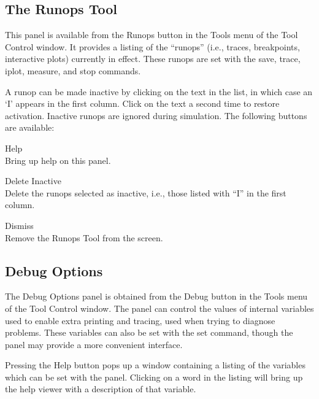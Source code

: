 \subsection{The Runops Tool}
\label{runoppanel}

This panel is available from the {\cb Runops} button in the {\cb Tools}
menu of the {\cb Tool Control} window.  It provides a listing of the
``runops'' (i.e., traces, breakpoints, interactive plots) currently in
effect.  These runops are set with the {\cb save}, {\cb trace}, {\cb
iplot}, {\cb measure}, and {\cb stop} commands.

A runop can be made inactive by clicking on the text in the list, in
which case an `I' appears in the first column.  Click on the text a
second time to restore activation.  Inactive runops are ignored during
simulation.  The following buttons are available:

\begin{description}
\item{\cb Help}\\
    Bring up help on this panel.
\item{\cb Delete Inactive}\\
    Delete the runops selected as inactive, i.e., those listed with
    ``I'' in the first column.
\item{\cb Dismiss}\\
    Remove the {\cb Runops Tool} from the screen.
\end{description}

\subsection{Debug Options}
\label{dbgopts}

The {\cb Debug Options} panel is obtained from the {\cb Debug} button
in the {\cb Tools} menu of the {\cb Tool Control} window.  The panel
can control the values of internal variables used to enable extra
printing and tracing, used when trying to diagnose problems.  These
variables can also be set with the {\cb set} command, though the panel
may provide a more convenient interface.

Pressing the {\cb Help} button pops up a window containing a listing
of the variables which can be set with the panel.  Clicking on a word
in the listing will bring up the help viewer with a description of
that variable.

